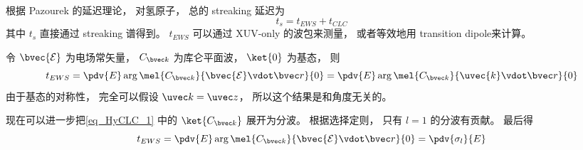 
\begin{issues}
\issueDraft
\end{issues}


根据 Pazourek 的延迟理论， 对氢原子， 总的 streaking 延迟为
\begin{equation}
t_s = t_{EWS} + t_{CLC}
\end{equation}
其中 $t_s$ 直接通过 streaking 谱得到。 $t_{EWS}$ 可以通过 XUV-only 的波包来测量， 或者等效地用 transition dipole来计算。

令 $\bvec{\mathcal E}$ 为电场常矢量， $C_{\bvec k}$ 为库仑平面波， $\ket{0}$ 为基态， 则
\begin{equation}\label{eq_HyCLC_1}
t_{EWS} = \pdv{E} \arg \mel{C_{\bvec k}}{\bvec{\mathcal E}\vdot \bvec r}{0} = \pdv{E} \arg \mel{C_{\bvec k}}{\uvec{k}\vdot \bvec r}{0}
\end{equation}
由于基态的对称性， 完全可以假设 $\uvec k = \uvec z$， 所以这个结果是和角度无关的。

现在可以进一步把\autoref{eq_HyCLC_1} 中的 $\ket{C_{\bvec k}}$ 展开为分波。 根据选择定则， 只有 $l = 1$ 的分波有贡献。 最后得
\begin{equation}\label{eq_HyCLC_2}
t_{EWS} = \pdv{E} \arg \mel{C_{\bvec k}}{\bvec{\mathcal E}\vdot \bvec r}{0} = \pdv{\sigma_l}{E}
\end{equation}
